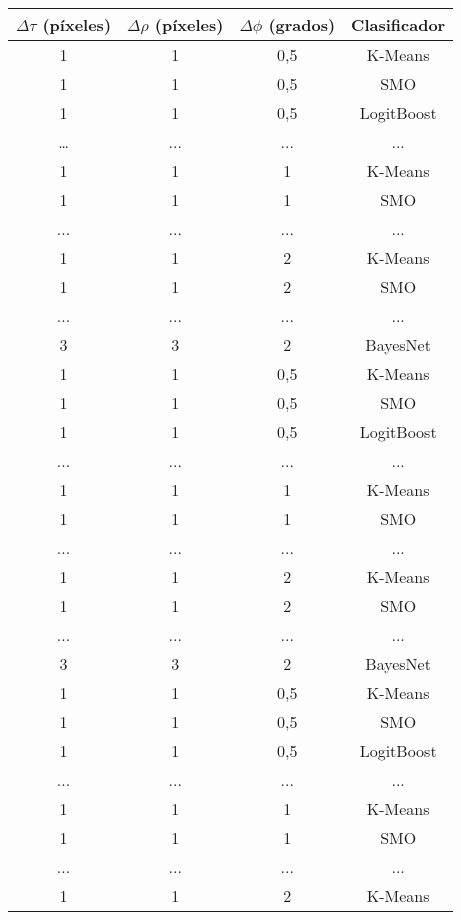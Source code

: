 \begin{longtable}{|c|c|c|c|}
        \hline
        \textbf{$\Delta \tau$ (píxeles)} & \textbf{$\Delta \rho$ (píxeles)} & \textbf{$\Delta \phi$ (grados)} & \textbf{Clasificador} \\  
        \hline
        \endhead
        1 & 1 & 0,5 & K-Means \\ \hline
        1 & 1 & 0,5 & SMO \\ \hline
        1 & 1 & 0,5 & LogitBoost \\ \hline
        \ldots & ... & ... & ... \\ \hline
        1 & 1 & 1 & K-Means \\ \hline
        1 & 1 & 1 & SMO \\ \hline
        ... & ... & ... & ... \\ \hline
        1 & 1 & 2 & K-Means \\ \hline
        1 & 1 & 2 & SMO \\ \hline
        ... & ... & ... & ... \\ \hline
        3 & 3 & 2 & BayesNet \\ \hline
        1 & 1 & 0,5 & K-Means \\ \hline
        1 & 1 & 0,5 & SMO \\ \hline
        1 & 1 & 0,5 & LogitBoost \\ \hline
        ... & ... & ... & ... \\ \hline
        1 & 1 & 1 & K-Means \\ \hline
        1 & 1 & 1 & SMO \\ \hline
        ... & ... & ... & ... \\ \hline
        1 & 1 & 2 & K-Means \\ \hline
        1 & 1 & 2 & SMO \\ \hline
        ... & ... & ... & ... \\ \hline
        3 & 3 & 2 & BayesNet \\ \hline
        1 & 1 & 0,5 & K-Means \\ \hline
        1 & 1 & 0,5 & SMO \\ \hline
        1 & 1 & 0,5 & LogitBoost \\ \hline
        ... & ... & ... & ... \\ \hline
        1 & 1 & 1 & K-Means \\ \hline
        1 & 1 & 1 & SMO \\ \hline
        ... & ... & ... & ... \\ \hline
        1 & 1 & 2 & K-Means \\ \hline

\end{longtable}
